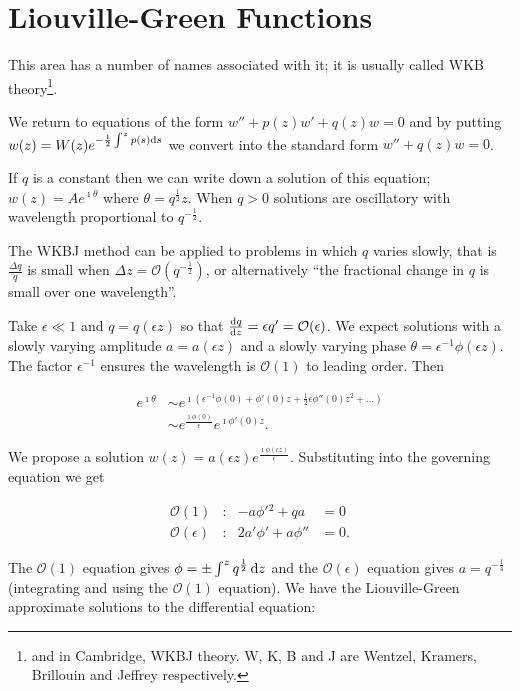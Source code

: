 \documentclass{notes}
\newcommand{\cO}{\mathcal{O}}
\theoremstyle{plain}
\begin{document}
\section{Liouville-Green Functions}

This area has a number of names associated with it; it is usually called
WKB theory\footnote{and in Cambridge, WKBJ theory.  W, K, B and J
are Wentzel, Kramers, Brillouin and Jeffrey respectively.}.

We return to equations of the form $w'' + p(z) w' + q(z) w = 0$
and by putting $w(z) = W(z) e^{-\frac{1}{2} \int^z p(s) \mathrm{d} s}$
we convert into the standard form $w'' + q(z) w = 0$.

If $q$ is a constant then we can write down a solution of this equation;
$w(z) = A e^{\imath \theta}$ where $\theta = q^{\frac{1}{2}} z$.  When
$q > 0$ solutions are oscillatory with wavelength proportional to
$q^{-\frac{1}{2}}$.

The WKBJ method can be applied to problems in which $q$ varies slowly,
that is $\frac{\Delta q}{q}$ is small when $\Delta z = \cO(q^{-\frac{1}{2}})$,
or alternatively ``the fractional change in $q$ is small over one wavelength''.


Take $\epsilon \ll 1$ and $q = q(\epsilon z)$ so that $\diff{q}{z} =
\epsilon q' = \cO(\epsilon)$.  We expect solutions with a
slowly varying amplitude $a = a(\epsilon z)$ and a slowly varying
phase $\theta = \epsilon^{-1} \phi(\epsilon z)$.  The factor
$\epsilon^{-1}$ ensures the wavelength is $\cO(1)$ to leading order.  Then

\begin{align*}
e^{\imath \theta} &\sim e^{\imath \left( \epsilon^{-1} \phi(0)
+ \phi'(0) z + \frac{1}{2} \epsilon \phi''(0) z^2 + \dots\right)} \\
&\sim e^{\frac{\imath \phi(0)}{\epsilon}} e^{\imath \phi'(0) z}.
\end{align*}

We propose a solution $w(z) = a(\epsilon z) e^{\frac{\imath \phi(\epsilon z)}
{\epsilon}}$.  Substituting into the governing equation we get

\begin{align*}
\cO(1) &: & -a \phi'{}^2 + q a &= 0 \\
\cO(\epsilon) &: & 2 a' \phi' + a \phi'' &= 0.
\end{align*} 

The $\cO(1)$ equation gives $\phi = \pm \int^z q^{\frac{1}{2}}\, \mathrm{d} z$
and the $\cO(\epsilon)$ equation gives $a = q^{-\frac{1}{4}}$ (integrating
and using the $\cO(1)$ equation).  We have the Liouville-Green approximate
solutions to the differential equation:
\end{document}

